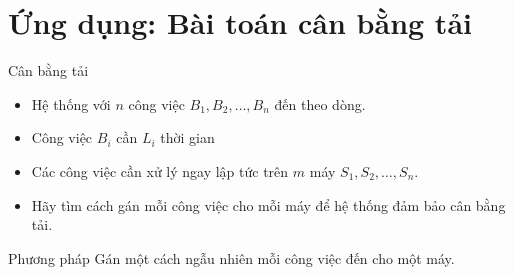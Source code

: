           \section{Ứng dụng: Bài toán cân bằng tải}
          \begin{frame}
            \begin{block}{Cân bằng tải}
              \begin{itemize}
              \item Hệ thống với $n$ công việc $B_1, B_2, \dots, B_n$ đến theo dòng.
              \item Công việc $B_i$ cần $L_i$ thời gian
                
              \item  Các công việc cần xử lý ngay
                lập tức trên $m$ máy $S_1, S_2, \dots, S_n$.
              \item Hãy tìm cách gán mỗi công việc cho mỗi máy để hệ thống đảm bảo cân bằng tải.
              \end{itemize}
            \end{block}\pause 

            \begin{block}{Phương pháp}
              Gán một cách ngẫu nhiên mỗi công việc đến cho một máy.  
            \end{block}
          \end{frame}

